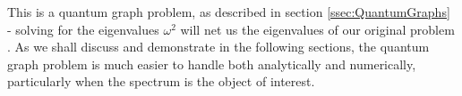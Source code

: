This is a quantum graph problem, as described in section \ref{ssec:QuantumGraphs} - solving for the eigenvalues $\omega^2$ will net us the eigenvalues of our original problem .
As we shall discuss and demonstrate in the following sections, the quantum graph problem is much easier to handle both analytically and numerically, particularly when the spectrum is the object of interest.